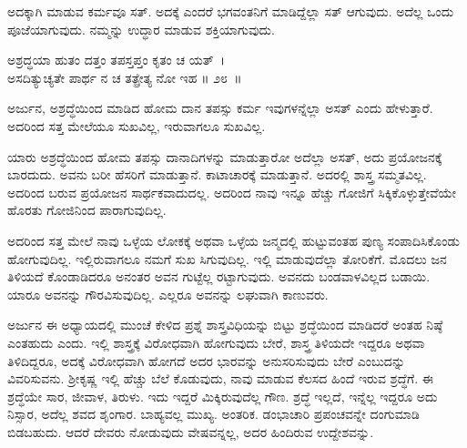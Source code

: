 ಅದಕ್ಕಾಗಿ ಮಾಡುವ ಕರ್ಮವೂ ಸತ್. ಅದಕ್ಕೆ ಎಂದರೆ ಭಗವಂತನಿಗೆ ಮಾಡಿದ್ದೆಲ್ಲಾ ಸತ್ ಆಗುವುದು. ಅದೆಲ್ಲ ಒಂದು ಪೂಜೆಯಾಗುವುದು. ನಮ್ಮನ್ನು ಉದ್ಧಾರ ಮಾಡುವ ಶಕ್ತಿಯಾಗುವುದು.

\begin{shloka}
ಅಶ್ರದ್ಧಯಾ ಹುತಂ ದತ್ತಂ ತಪಸ್ತಪ್ತಂ ಕೃತಂ ಚ ಯತ್~।\\ಅಸದಿತ್ಯುಚ್ಯತೇ ಪಾರ್ಥ ನ ಚ ತತ್ಪ್ರೇತ್ಯ ನೋ ಇಹ \hfill॥ ೨೮~॥
\end{shloka}

\begin{artha}
ಅರ್ಜುನ, ಅಶ್ರದ್ಧೆಯಿಂದ ಮಾಡಿದ ಹೋಮ ದಾನ ತಪಸ್ಸು ಕರ್ಮ ಇವುಗಳನ್ನೆಲ್ಲಾ ಅಸತ್ ಎಂದು ಹೇಳುತ್ತಾರೆ. ಅದರಿಂದ ಸತ್ತ ಮೇಲೆಯೂ ಸುಖವಿಲ್ಲ, ಇರುವಾಗಲೂ ಸುಖವಿಲ್ಲ.
\end{artha}

ಯಾರು ಅಶ್ರದ್ಧೆಯಿಂದ ಹೋಮ ತಪಸ್ಸು ದಾನಾದಿಗಳನ್ನು ಮಾಡುತ್ತಾರೋ ಅದೆಲ್ಲಾ ಅಸತ್, ಅದು ಪ್ರಯೋಜನಕ್ಕೆ ಬಾರದುದು. ಅವನು ಬರೀ ಹೆಸರಿಗೆ ಮಾಡುತ್ತಾನೆ. ಕಾಟಾಚಾರಕ್ಕೆ ಮಾಡುತ್ತಾನೆ. ಅದರಲ್ಲಿ ಶಾಸ್ತ್ರ ಸಮ್ಮತವಿಲ್ಲ. ಅದರಿಂದ ಬರುವ ಪ್ರಯೋಜನ ಸಾರ್ಥಕವಾದುದಲ್ಲ. ಅದರಿಂದ ನಾವು ಇನ್ನೂ ಹೆಚ್ಚು ಗೋಜಿಗೆ ಸಿಕ್ಕಿಕೊಳ್ಳುತ್ತೇವೆಯೇ ಹೊರತು ಗೋಜಿನಿಂದ ಪಾರಾಗುವುದಿಲ್ಲ.

ಅದರಿಂದ ಸತ್ತ ಮೇಲೆ ನಾವು ಒಳ್ಳೆಯ ಲೋಕಕ್ಕೆ ಅಥವಾ ಒಳ್ಳೆಯ ಜನ್ಮದಲ್ಲಿ ಹುಟ್ಟುವಂತಹ ಪುಣ್ಯ ಸಂಪಾದಿಸಿಕೊಂಡು ಹೋಗುವುದಿಲ್ಲ. ಇಲ್ಲಿರುವಾಗಲೂ ನಮಗೆ ಸುಖ ಸಿಗುವುದಿಲ್ಲ. ಇಲ್ಲಿ ಮಾಡುವುದೆಲ್ಲಾ ತೋರಿಕೆಗೆ. ಮೊದಲು ಜನ ತಿಳಿಯದೆ ಕೊಂಡಾಡಿದರೂ ಅನಂತರ ಅವನ ಗುಟ್ಟೆಲ್ಲ ರಟ್ಟಾಗುವುದು. ಅವನದು ಬಂಡವಾಳವಿಲ್ಲದ ಬಡಾಯಿ. ಯಾರೂ ಅವನನ್ನು ಗೌರವಿಸುವುದಿಲ್ಲ. ಎಲ್ಲರೂ ಅವನನ್ನು ಲಘುವಾಗಿ ಕಾಣುವರು.

ಅರ್ಜುನ ಈ ಅಧ್ಯಾಯದಲ್ಲಿ ಮುಂಚೆ ಕೇಳಿದ ಪ್ರಶ್ನೆ ಶಾಸ್ತ್ರವಿಧಿಯನ್ನು ಬಿಟ್ಟು ಶ್ರದ್ಧೆಯಿಂದ ಮಾಡಿದರೆ ಅಂತಹ ನಿಷ್ಠೆ ಎಂತಹುದು ಎಂದು. ಇಲ್ಲಿ ಶಾಸ್ತ್ರಕ್ಕೆ ವಿರೋಧವಾಗಿ ಹೋಗುವುದು ಬೇರೆ, ಶಾಸ್ತ್ರ ತಿಳಿಯದೇ ಇದ್ದರೂ ಅಥವಾ ತಿಳಿದಿದ್ದರೂ, ಅದಕ್ಕೆ ವಿರೋಧವಾಗಿ ಹೋಗದೆ ಅದರ ಭಾರವನ್ನು ಅನುಸರಿಸುವುದು ಬೇರೆ ಎಂಬುದನ್ನು ವಿವರಿಸುವನು. ಶ‍್ರೀಕೃಷ್ಣ ಇಲ್ಲಿ ಹೆಚ್ಚು ಬೆಲೆ ಕೊಡುವುದು, ನಾವು ಮಾಡುವ ಕೆಲಸದ ಹಿಂದೆ ಇರುವ ಶ್ರದ್ಧೆಗೆ. ಈ ಶ್ರದ್ಧೆಯೇ ಸಾರ, ಜೀವಾಳ, ತಿರುಳು. ಇದು ಇದ್ದರೆ ಮಿಕ್ಕಿರುವುದೆಲ್ಲ ಗೌಣ. ಶ್ರದ್ಧೆ ಇಲ್ಲದೆ, ಇನ್ನೆಲ್ಲ ಇದ್ದರೂ ಅದು ನಿಸ್ಸಾರ, ಅದೆಲ್ಲ ಶವದ ಶೃಂಗಾರ. ಬಾಹ್ಯವಲ್ಲ ಮುಖ್ಯ. ಅಂತರಿಕ. ಡಂಭಾಚಾರಿ ಪ್ರಪಂಚವನ್ನೇ ದಂಗುಮಾಡಿ ಬಿಡಬಹುದು. ಆದರೆ ದೇವರು ನೋಡುವುದು ವೇಷವನ್ನಲ್ಲ, ಅದರ ಹಿಂದಿರುವ ಉದ್ದೇಶವನ್ನು.

